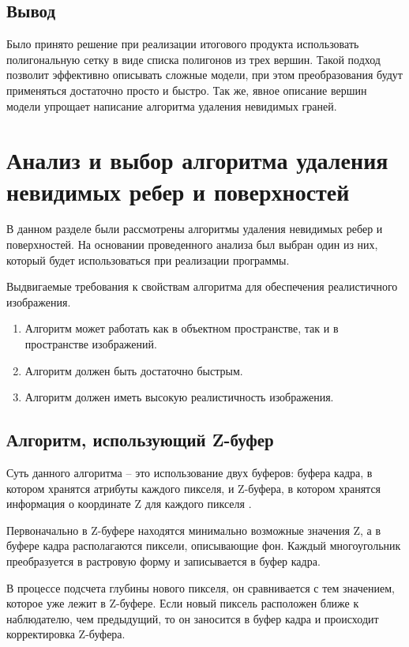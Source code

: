 \subsection*{Вывод}

Было принято решение при реализации итогового продукта использовать полигональную сетку в виде списка полигонов из трех вершин. Такой подход позволит эффективно описывать сложные модели, при этом преобразования будут применяться достаточно просто и быстро. Так же, явное описание вершин модели упрощает написание алгоритма удаления невидимых граней.

\section{Анализ и выбор алгоритма удаления невидимых ребер и поверхностей}

В данном разделе были рассмотрены алгоритмы удаления невидимых ребер и поверхностей. На основании проведенного анализа был выбран один из них, который будет использоваться при реализации программы.

Выдвигаемые требования к свойствам алгоритма для обеспечения реалистичного изображения.

\begin{enumerate}
	\item Алгоритм может работать как в объектном пространстве, так и в пространстве изображений.
	\item Алгоритм должен быть достаточно быстрым.
	\item Алгоритм должен иметь высокую реалистичность изображения.
\end{enumerate}

\subsection{Алгоритм, использующий Z-буфер}

Суть данного алгоритма – это использование двух буферов: буфера кадра, в котором хранятся атрибуты каждого пикселя, и Z-буфера, в котором хранятся информация о координате Z для каждого пикселя \cite{zbuffer}.

Первоначально в Z-буфере находятся минимально возможные значения Z, а в буфере кадра располагаются пиксели, описывающие фон. Каждый многоугольник преобразуется в растровую форму и записывается в буфер кадра.

В процессе подсчета глубины нового пикселя, он сравнивается с тем значением, которое уже лежит в Z-буфере. Если новый пиксель расположен ближе к наблюдателю, чем предыдущий, то он заносится в буфер кадра и происходит корректировка Z-буфера.

